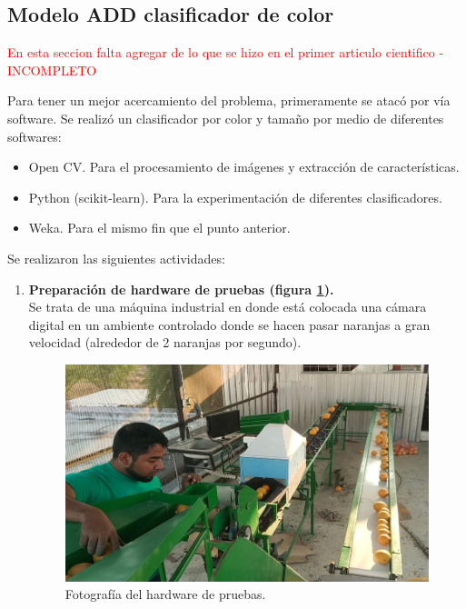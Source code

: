 \documentclass[twoside,spanish,ESP,MSc]{plantillaLabUPV}
\theoremstyle{definition}
\begin{document}
\begin{enumerate}
	\section{Modelo ADD clasificador de color}
	\textcolor{red}{En esta seccion falta agregar de lo que se hizo en el primer articulo cientifico - INCOMPLETO}
	
	Para tener un mejor acercamiento del problema, primeramente se atacó por vía software. Se realizó un clasificador por color y tamaño por medio de diferentes softwares:
	
	\begin{itemize}
		\item Open CV. Para el procesamiento de imágenes y extracción de características.
		\item Python (scikit-learn). Para la experimentación de diferentes clasificadores.
		\item Weka. Para el mismo fin que el punto anterior.
	\end{itemize}
	

Se realizaron las siguientes actividades:

\begin{enumerate}
	\item \textbf{Preparación de hardware de pruebas (figura \ref{maq}).}\\Se trata de una máquina industrial en donde está colocada una cámara digital en un ambiente controlado donde se hacen pasar naranjas a gran velocidad (alrededor de 2 naranjas por segundo).
	
	\begin{figure}[h]
		\centering
		\includegraphics*[scale=0.275]{maq} 
		\caption{Fotografía del hardware de pruebas.}
		\label{maq}
	\end{figure}
	

\end{enumerate}
\end{enumerate}
\end{document}
